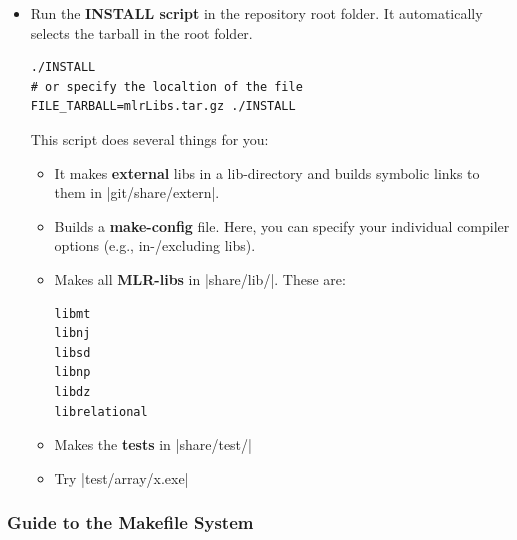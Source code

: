 \begin{itemize}
\item Run the \textbf{INSTALL script} in the repository root folder.
  It automatically selects the tarball in the root folder.
\begin{code}
\begin{verbatim}
./INSTALL
# or specify the localtion of the file
FILE_TARBALL=mlrLibs.tar.gz ./INSTALL
\end{verbatim}
\end{code}
This script does several things for you:

\begin{itemize}

\item It makes \textbf{external} libs in a lib-directory and builds
symbolic links to them in |git/share/extern|.

\item Builds a \textbf{make-config} file. Here, you can specify your
individual compiler options (e.g., in-/excluding libs).

\item Makes all \textbf{MLR-libs} in |share/lib/|. These are:
\begin{code}
\begin{verbatim}
libmt
libnj
libsd
libnp
libdz
librelational
\end{verbatim}
\end{code}



\item Makes the \textbf{tests} in |share/test/|

\item Try |test/array/x.exe|

\end{itemize}

\end{itemize}



\subsubsection{Guide to the Makefile System}

